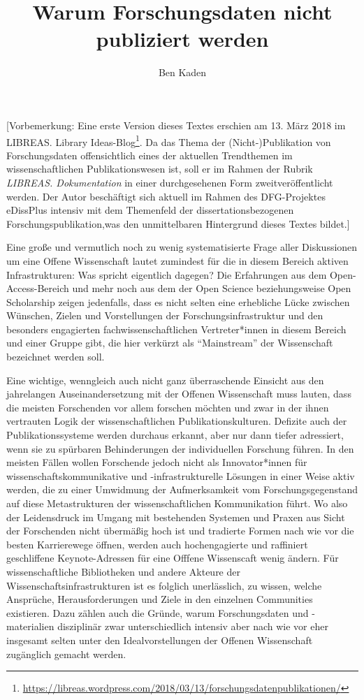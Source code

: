 \documentclass[a4paper,
fontsize=11pt,
oneside,
numbers=noperiodatend,
parskip=half-,
bibliography=totoc,
final
]{scrartcl}
\title{\LARGE{Warum Forschungsdaten nicht publiziert werden}} %
\author{Ben Kaden} %
\date{}
\begin{document}
\maketitle
\thispagestyle{fancyplain} 


{[}Vorbemerkung: Eine erste Version dieses Textes erschien am 13. März
2018 im LIBREAS. Library Ideas-Blog\footnote{\url{https://libreas.wordpress.com/2018/03/13/forschungsdatenpublikationen/}}.
Da das Thema der (Nicht-)Publikation von Forschungsdaten offensichtlich
eines der aktuellen Trendthemen im wissenschaftlichen Publikationswesen
ist, soll er im Rahmen der Rubrik \emph{LIBREAS. Dokumentation} in einer
durchgesehenen Form zweitveröffentlicht werden. Der Autor beschäftigt
sich aktuell im Rahmen des DFG-Projektes eDissPlus intensiv mit dem
Themenfeld der dissertationsbezogenen Forschungspublikation,was den
unmittelbaren Hintergrund dieses Textes bildet.{]}

Eine große und vermutlich noch zu wenig systematisierte Frage aller
Diskussionen um eine Offene Wissenschaft lautet zumindest für die in
diesem Bereich aktiven Infrastrukturen: Was spricht eigentlich dagegen?
Die Erfahrungen aus dem Open-Access-Bereich und mehr noch aus dem der
Open Science beziehungsweise Open Scholarship zeigen jedenfalls, dass es
nicht selten eine erhebliche Lücke zwischen Wünschen, Zielen und
Vorstellungen der Forschungsinfrastruktur und den besonders engagierten
fachwissenschaftlichen Vertreter*innen in diesem Bereich und einer
Gruppe gibt, die hier verkürzt als \enquote{Mainstream} der Wissenschaft
bezeichnet werden soll.

Eine wichtige, wenngleich auch nicht ganz überraschende Einsicht aus den
jahrelangen Auseinandersetzung mit der Offenen Wissenschaft muss lauten,
dass die meisten Forschenden vor allem forschen möchten und zwar in der
ihnen vertrauten Logik der wissenschaftlichen Publikationskulturen.
Defizite auch der Publikationssysteme werden durchaus erkannt, aber nur
dann tiefer adressiert, wenn sie zu spürbaren Behinderungen der
individuellen Forschung führen. In den meisten Fällen wollen Forschende
jedoch nicht als Innovator*innen für wissenschaftskommunikative und
-infrastrukturelle Lösungen in einer Weise aktiv werden, die zu einer
Umwidmung der Aufmerksamkeit vom Forschungsgegenstand auf diese
Metastrukturen der wissenschaftlichen Kommunikation führt. Wo also der
Leidensdruck im Umgang mit bestehenden Systemen und Praxen aus Sicht der
Forschenden nicht übermäßig hoch ist und tradierte Formen nach wie vor
die besten Karrierewege öffnen, werden auch hochengagierte und
raffiniert geschliffene Keynote-Adressen für eine Offfene Wissenscaft
wenig ändern. Für wissenschaftliche Bibliotheken und andere Akteure der
Wissenschaftsinfrastrukturen ist es folglich unerlässlich, zu wissen,
welche Ansprüche, Herausforderungen und Ziele in den einzelnen
Communities existieren. Dazu zählen auch die Gründe, warum
Forschungsdaten und -materialien disziplinär zwar unterschiedlich
intensiv aber nach wie vor eher insgesamt selten unter den
Idealvorstellungen der Offenen Wissenschaft zugänglich gemacht werden.
\end{document}
